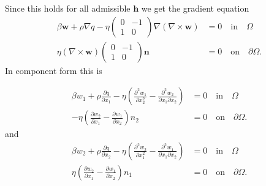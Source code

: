 \documentclass[11pt, a4paper]{article}
\theoremstyle{definition}
\newcommand{\w}{\mathbf{w}}
\newcommand{\n}{\mathbf{n}}
\newcommand{\h}{\mathbf{h}}
\begin{document}
Since this holds for all admissible $\h$ we get the gradient equation
\begin{align*}
	 \beta \w  + \rho \nabla q - \eta 	\begin{pmatrix}
	 	0 & -1\\
	 	1 & 0
	 \end{pmatrix} \nabla\left(\nabla \times  \w\right) &= 0\quad \text{in} \quad \Omega\\
	\eta \left(\nabla \times \w\right) \begin{pmatrix}
		0 & -1\\
		1 & 0
	\end{pmatrix} 
	\n &= 0 \quad \text{on} \quad \partial \Omega.
\end{align*}
In component form this is 

\begin{align*}
	\beta w_1 + \rho \frac{\partial q}{\partial x_1} - \eta \left(\frac{\partial^2 w_1}{\partial x_2^2} - \frac{\partial^2 w_2}{\partial x_1 \partial x_2} \right) &= 0\quad \text{in} \quad \Omega\\
	-\eta \left(\frac{\partial w_2}{\partial x_1} - \frac{\partial w_1}{\partial x_2} \right)n_2 &= 0 \quad \text{on} \quad \partial \Omega.
\end{align*}
and
\begin{align*}
	\beta w_2 + \rho \frac{\partial q}{\partial x_2} - \eta \left( \frac{\partial^2 w_2}{ \partial x_1^2} -\frac{\partial^2 w_1}{\partial x_1 \partial x_2}\right) &= 0\quad \text{in} \quad \Omega\\
	\eta \left(\frac{\partial w_2}{\partial x_1} - \frac{\partial w_1}{\partial x_2} \right)n_1 &= 0 \quad \text{on} \quad \partial \Omega.
\end{align*}
\end{document}
